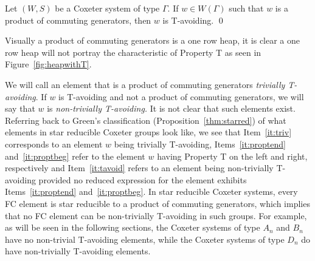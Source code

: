 \begin{proposition}\label{thm:trivTavoid}
Let $(W,S)$ be a Coxeter system of type $\Gamma$. If $w \in W(\Gamma)$ such that $w$ is a product of commuting generators, then $w$ is T-avoiding. \qed	
\end{proposition}

Visually a product of commuting generators is a one row heap, it is clear a one row heap will not portray the characteristic of Property T as seen in Figure~\ref{fig:heapwithT}.

We will call an element that is a product of commuting generators \emph{trivially T-avoiding}. If $w$ is T-avoiding and not a product of commuting generators, we will say that $w$ is \emph{non-trivially T-avoiding.} It is not clear that such elements exist. Referring back to Green's classification (Proposition~\ref{thm:starred}) of what elements in star reducible Coxeter groups look like, we see that Item~\ref{it:triv} corresponds to an element $w$ being trivially T-avoiding, Items~\ref{it:proptend} and~\ref{it:proptbeg} refer to the element $w$ having Property T on the left and right, respectively and Item~\ref{it:tavoid} refers to an element being non-trivially T-avoiding provided no reduced expression for the element exhibits Items~\ref{it:proptend} and~\ref{it:proptbeg}. In star reducible Coxeter systems, every FC element is star reducible to a product of commuting generators, which implies that no FC element can be non-trivially T-avoiding in such groups. For example, as will be seen in the following sections, the Coxeter systems of type $A_n$ and $B_n$ have no non-trivial T-avoiding elements, while the Coxeter systems of type $D_n$ do have non-trivially T-avoiding elements.


